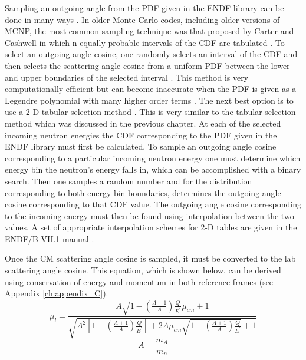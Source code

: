 Sampling an outgoing angle from the PDF given in the ENDF library can be done 
in many ways \citep{lux_monte_1991}. In older Monte Carlo codes, including older
versions of MCNP, the most common sampling technique was that proposed by 
Carter and Cashwell in which n equally probable intervals of the CDF are 
tabulated \citep{l._l._particle-transport_1975}. To select an outgoing angle 
cosine, one randomly selects an interval of the CDF and then selects the 
scattering angle cosine from a uniform PDF between the lower and upper 
boundaries of the selected interval \citep{lux_monte_1991}. This method is very 
computationally efficient but can become inaccurate when the PDF is given as a 
Legendre polynomial with many higher order terms 
\citep{x-5_monte_carlo_team_mcnp_2003}. The next best option is to use a 2-D 
tabular selection method \citep{x-5_monte_carlo_team_mcnp_2003}. This is very
similar to the tabular selection method which was discussed in the previous 
chapter. At each of the selected incoming neutron energies the CDF corresponding
to the PDF given in the ENDF library must first be calculated. To sample an 
outgoing angle cosine corresponding to a particular incoming neutron energy one
must determine which energy bin the neutron's energy falls in, which can be 
accomplished with a binary search. Then one samples a random number and 
for the distribution corresponding to both energy bin boundaries, determines 
the outgoing angle cosine corresponding to that CDF value. The outgoing angle
cosine corresponding to the incoming energy must then be found using
interpolation between the two values. A set of appropriate interpolation schemes
for 2-D tables are given in the ENDF/B-VII.1 manual 
\citep{chadwick_endf/b-vii.1_2011}. 

Once the CM scattering angle cosine is sampled, it must be converted to the 
lab scattering angle cosine. This equation, which is shown below, can be derived
using conservation of energy and momentum in both reference frames (see 
Appendix \ref{ch:appendix_C}).
\begin{equation}
  \mu_{l} = \frac{A\sqrt{1-\left(\frac{A+1}{A}\right)\frac{Q}{E^{'}}}\mu_{cm} + 1}
  {\sqrt{A^2\left[1-\left(\frac{A+1}{A}\right)\frac{Q}{E^{'}}\right] + 
      2A\mu_{cm}\sqrt{1-\left(\frac{A+1}{A}\right)\frac{Q}{E^{'}}} + 1}}
  \label{eq:lab_scatterin_angle_cosine}
\end{equation}
\begin{equation*}
  A = \frac{m_A}{m_n}
\end{equation*}


